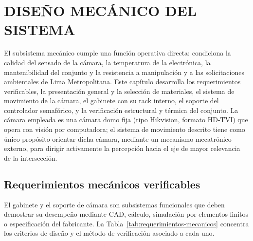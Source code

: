\chapter{DISEÑO MECÁNICO DEL SISTEMA}\label{cap:diseno-mecanico}

El subsistema mecánico cumple una función operativa directa: condiciona la calidad del sensado de la cámara, la temperatura de la electrónica, la mantenibilidad del conjunto y la resistencia a manipulación y a las solicitaciones ambientales de Lima Metropolitana. Este capítulo desarrolla los requerimientos verificables, la presentación general y la selección de materiales, el sistema de movimiento de la cámara, el gabinete con su rack interno, el soporte del controlador semafórico, y la verificación estructural y térmica del conjunto. La cámara empleada es una cámara domo fija (tipo Hikvision, formato HD-TVI) que opera con visión por computadora; el sistema de movimiento descrito tiene como único propósito orientar dicha cámara, mediante un mecanismo mecatrónico externo, para dirigir activamente la percepción hacia el eje de mayor relevancia de la intersección.

\section{Requerimientos mecánicos verificables}\label{sec:requerimientos-mecanicos}

El gabinete y el soporte de cámara son subsistemas funcionales que deben demostrar su desempeño mediante CAD, cálculo, simulación por elementos finitos o especificación del fabricante. La Tabla~\ref{tab:requerimientos-mecanicos} concentra los criterios de diseño y el método de verificación asociado a cada uno.

